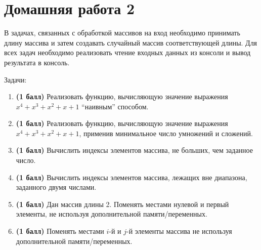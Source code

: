 \section{Домашняя работа 2}

В задачах, связанных с обработкой массивов на вход необходимо принимать длину массива и затем создавать случайный массив соответствующей длины. Для всех задач необходимо реализовать чтение входных данных из консоли и вывод результата в консоль.

Задачи:
\begin{enumerate}
    \item \textbf{(1 балл)} Реализовать функцию, вычисляющую значение выражения $x^4+x^3+x^2+x+1$ ``наивным'' способом. 
    \item \textbf{(1 балл)} Реализовать функцию, вычисляющую значение выражения $x^4+x^3+x^2+x+1$, применив минимальное число умножений и сложений.
    \item \textbf{(1 балл)} Вычислить индексы элементов массива, не больших, чем заданное число.
    \item \textbf{(1 балл)} Вычислить индексы элементов массива, лежащих вне диапазона, заданного двумя числами.
    \item \textbf{(1 балл)} Дан массив длины 2. Поменять местами нулевой и первый элементы, не используя дополнительной памяти/переменных.
    \item \textbf{(1 балл)} Поменять местами $i$-й и $j$-й элементы массива не используя дополнительной памяти/переменных.
\end{enumerate}